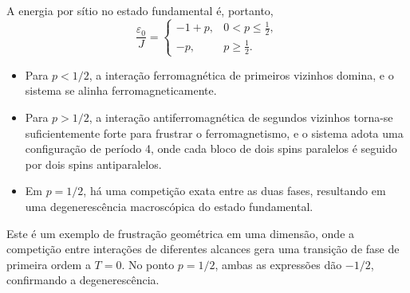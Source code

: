 \documentclass[11pt,a4paper]{article}
\begin{document}
%
A energia por sítio no estado fundamental é, portanto,
%
\begin{equation}
    \frac{\varepsilon_0}{J} =
    \begin{cases}
        -1 + p, & 0 < p \leq \frac{1}{2}, \\[4pt]
        -p, & p \geq \frac{1}{2}.
    \end{cases}
    \label{eq:eps0_annni}
\end{equation}
%
\begin{itemize}
    \item Para \(p < 1/2\), a interação ferromagnética de primeiros vizinhos domina, e o sistema se alinha ferromagneticamente.
    \item Para \(p > 1/2\), a interação antiferromagnética de segundos vizinhos torna-se suficientemente forte para frustrar o ferromagnetismo, e o sistema adota uma configuração de período 4, onde cada bloco de dois spins paralelos é seguido por dois spins antiparalelos.
    \item Em \(p = 1/2\), há uma competição exata entre as duas fases, resultando em uma degenerescência macroscópica do estado fundamental.
\end{itemize}
%
Este é um exemplo de frustração geométrica em uma dimensão, onde a competição entre interações de diferentes alcances gera uma transição de fase de primeira ordem a \(T=0\). No ponto \(p = 1/2\), ambas as expressões dão \(-1/2\), confirmando a degenerescência.
%
\end{document}
